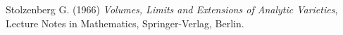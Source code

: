 \documentclass[letterpaper]{beamer}
\newcommand{\con}{\ensuremath{\mathbb{C}^n}}
\begin{document}
\begin{thebibliography}{3}
 Stolzenberg G. (1966) \textit{Volumes, Limits and
Extensions of Analytic Varieties}, Lecture Notes in Mathematics,
Springer-Verlag, Berlin.
\end{thebibliography}
\end{document}
